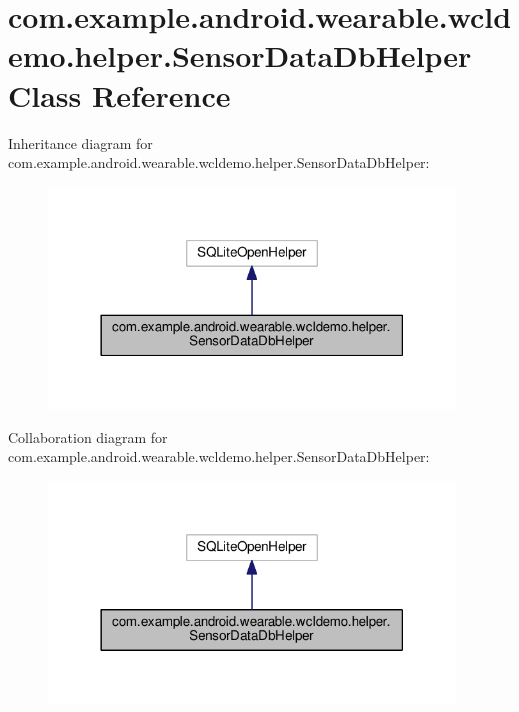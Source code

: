 \hypertarget{classcom_1_1example_1_1android_1_1wearable_1_1wcldemo_1_1helper_1_1SensorDataDbHelper}{}\section{com.\+example.\+android.\+wearable.\+wcldemo.\+helper.\+Sensor\+Data\+Db\+Helper Class Reference}
\label{classcom_1_1example_1_1android_1_1wearable_1_1wcldemo_1_1helper_1_1SensorDataDbHelper}


Inheritance diagram for com.\+example.\+android.\+wearable.\+wcldemo.\+helper.\+Sensor\+Data\+Db\+Helper\+:\nopagebreak
\begin{figure}[H]
\begin{center}
\leavevmode
\includegraphics[width=306pt]{d7/df3/classcom_1_1example_1_1android_1_1wearable_1_1wcldemo_1_1helper_1_1SensorDataDbHelper__inherit__graph}
\end{center}
\end{figure}


Collaboration diagram for com.\+example.\+android.\+wearable.\+wcldemo.\+helper.\+Sensor\+Data\+Db\+Helper\+:\nopagebreak
\begin{figure}[H]
\begin{center}
\leavevmode
\includegraphics[width=306pt]{d6/d87/classcom_1_1example_1_1android_1_1wearable_1_1wcldemo_1_1helper_1_1SensorDataDbHelper__coll__graph}
\end{center}
\end{figure}
